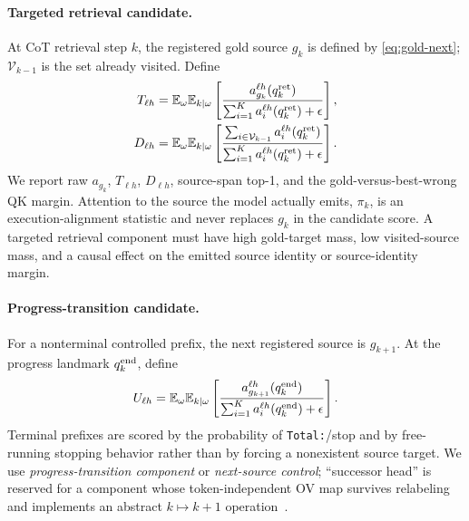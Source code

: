 \paragraph{Targeted retrieval candidate.}
At CoT retrieval step \(k\), the registered gold source \(g_k\) is defined by
\cref{eq:gold-next}; \(\mathcal V_{k-1}\) is the set already visited. Define
\begin{align}
  T_{\ell h}
  &=
  \mathbb{E}_\omega\mathbb{E}_{k\mid\omega}
  \left[
  \frac{a_{g_k}^{\ell h}(q_k^{\rm ret})}
       {\sum_{i=1}^{K}a_i^{\ell h}(q_k^{\rm ret})+\epsilon}
  \right],
\label{eq:target-score}\\
  D_{\ell h}
  &=
  \mathbb{E}_\omega\mathbb{E}_{k\mid\omega}
  \left[
  \frac{\sum_{i\in\mathcal V_{k-1}}a_i^{\ell h}(q_k^{\rm ret})}
       {\sum_{i=1}^{K}a_i^{\ell h}(q_k^{\rm ret})+\epsilon}
  \right].
\label{eq:duplicate-score}
\end{align}
We report raw \(a_{g_k}\), \(T_{\ell h}\), \(D_{\ell h}\), source-span top-1,
and the gold-versus-best-wrong QK margin. Attention to the source the model
actually emits, \(\pi_k\), is an execution-alignment statistic and never
replaces \(g_k\) in the candidate score. A targeted retrieval component must
have high gold-target mass, low visited-source mass, and a causal effect on
the emitted source identity or source-identity margin.

\paragraph{Progress-transition candidate.}
For a nonterminal controlled prefix, the next registered source is
\(g_{k+1}\). At the progress landmark \(q_k^{\rm end}\), define
\begin{equation}
  U_{\ell h}=
  \mathbb{E}_\omega\mathbb{E}_{k\mid\omega}
  \left[
  \frac{a_{g_{k+1}}^{\ell h}(q_k^{\rm end})}
       {\sum_{i=1}^{K}a_i^{\ell h}(q_k^{\rm end})+\epsilon}
  \right].
\label{eq:progress-score}
\end{equation}
Terminal prefixes are scored by the probability of \texttt{Total:}/stop and
by free-running stopping behavior rather than by forcing a nonexistent source
target. We use \emph{progress-transition component} or
\emph{next-source control}; ``successor head'' is reserved for a component
whose token-independent OV map survives relabeling and implements an abstract
\(k\mapsto k+1\) operation~\citep{gould2023successor}.


